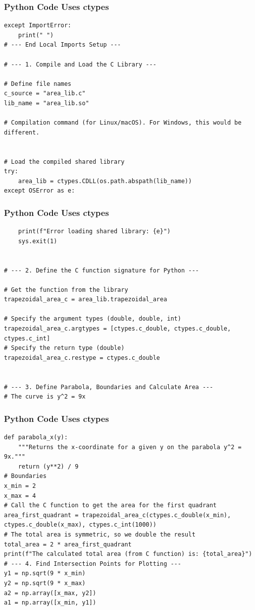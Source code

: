 \documentclass{beamer}
\begin{document}
\begin{frame}[fragile]
\frametitle{Python Code Uses ctypes}
\begin{lstlisting}
except ImportError:
    print(" ")
# --- End Local Imports Setup ---

# --- 1. Compile and Load the C Library ---

# Define file names
c_source = "area_lib.c"
lib_name = "area_lib.so"

# Compilation command (for Linux/macOS). For Windows, this would be different.


# Load the compiled shared library
try:
    area_lib = ctypes.CDLL(os.path.abspath(lib_name))
except OSError as e:
 \end{lstlisting}
 \end{frame}
\begin{frame}[fragile]
\frametitle{Python Code Uses ctypes}
\begin{lstlisting}
    print(f"Error loading shared library: {e}")
    sys.exit(1)


# --- 2. Define the C function signature for Python ---

# Get the function from the library
trapezoidal_area_c = area_lib.trapezoidal_area

# Specify the argument types (double, double, int)
trapezoidal_area_c.argtypes = [ctypes.c_double, ctypes.c_double, ctypes.c_int]
# Specify the return type (double)
trapezoidal_area_c.restype = ctypes.c_double


# --- 3. Define Parabola, Boundaries and Calculate Area ---
# The curve is y^2 = 9x
 \end{lstlisting}
 \end{frame}
\begin{frame}[fragile]
\frametitle{Python Code Uses ctypes}
\begin{lstlisting}
def parabola_x(y):
    """Returns the x-coordinate for a given y on the parabola y^2 = 9x."""
    return (y**2) / 9
# Boundaries
x_min = 2
x_max = 4
# Call the C function to get the area for the first quadrant
area_first_quadrant = trapezoidal_area_c(ctypes.c_double(x_min), ctypes.c_double(x_max), ctypes.c_int(1000))
# The total area is symmetric, so we double the result
total_area = 2 * area_first_quadrant
print(f"The calculated total area (from C function) is: {total_area}")
# --- 4. Find Intersection Points for Plotting ---
y1 = np.sqrt(9 * x_min)
y2 = np.sqrt(9 * x_max)
a2 = np.array([x_max, y2])
a1 = np.array([x_min, y1])
 \end{lstlisting}
 \end{frame}
\end{document}
